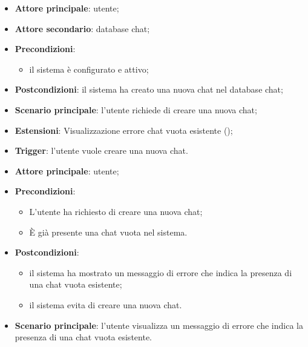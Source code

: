 \documentclass[10pt, a4paper]{article}
\begin{document}
    \begin{itemize}
        \item \textbf{Attore principale}: utente;
        \item \textbf{Attore secondario}: database chat;
        \item \textbf{Precondizioni}:
        \begin{itemize}
            \item il sistema è configurato e attivo;
        \end{itemize}
        \item \textbf{Postcondizioni}: il sistema ha creato una nuova chat nel database chat;
        \item \textbf{Scenario principale}: l’utente richiede di creare una nuova chat;
        \item \textbf{Estensioni}: Visualizzazione errore chat vuota esistente ();
        \item \textbf{Trigger}: l’utente vuole creare una nuova chat.
    \end{itemize}

    \begin{itemize}
        \item \textbf{Attore principale}: utente;
        \item \textbf{Precondizioni}:
        \begin{itemize}
            \item L’utente ha richiesto di creare una nuova chat;
            \item È già presente una chat vuota nel sistema.
        \end{itemize}
        \item \textbf{Postcondizioni}:
        \begin{itemize}
            \item il sistema ha mostrato un messaggio di errore che indica la presenza di una chat vuota esistente;
            \item il sistema evita di creare una nuova chat.
        \end{itemize}
        \item \textbf{Scenario principale}: l’utente visualizza un messaggio di errore che indica la presenza di una chat vuota esistente.
    \end{itemize}
\end{document}
